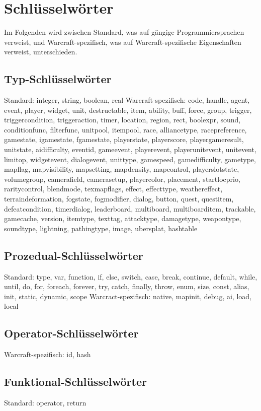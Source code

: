 \chapter{Schlüsselwörter}

Im Folgenden wird zwischen Standard, was auf gängige Programmiersprachen verweist, und Warcraft-spezifisch, was auf Warcraft-spezifische
Eigenschaften verweist, unterschieden.

\section{Typ-Schlüsselwörter}
Standard: integer, string, boolean, real
Warcraft-spezifisch: code, handle, agent, event, player, widget, unit, destructable, item, ability, buff, force, group, trigger, triggercondition, triggeraction, timer, location, region, rect, boolexpr, sound, conditionfunc, filterfunc, unitpool, itempool, race, alliancetype, racepreference, gamestate, igamestate, fgamestate, playerstate, playerscore, playergameresult, unitstate, aidifficulty, eventid, gameevent, playerevent, playerunitevent, unitevent, limitop, widgetevent, dialogevent, unittype, gamespeed, gamedifficulty, gametype, mapflag, mapvisibility, mapsetting, mapdensity, mapcontrol, playerslotstate, volumegroup, camerafield, camerasetup, playercolor, placement, startlocprio, raritycontrol, blendmode, texmapflags, effect, effecttype, weathereffect, terraindeformation, fogstate, fogmodifier, dialog, button, quest, questitem, defeatcondition, timerdialog, leaderboard, multiboard, multiboarditem, trackable, gamecache, version, itemtype, texttag, attacktype, damagetype, weapontype, soundtype, lightning, pathingtype, image, ubersplat, hashtable

\section{Prozedual-Schlüsselwörter}
Standard: type, var, function, if, else, switch, case, break, continue, default, while, until, do, for, foreach, forever, try, catch, finally, throw, enum, size, const, alias, init, static, dynamic, scope
Warcract-spezifisch: native, mapinit, debug, ai, load, local

\section{Operator-Schlüsselwörter}
Warcraft-spezifisch: id, hash

\section{Funktional-Schlüsselwörter}
Standard: operator, return

